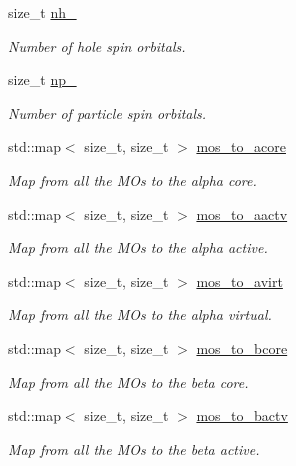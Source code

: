 \begin{DoxyCompactItemize}
size\+\_\+t \mbox{\hyperlink{classforte_1_1_m_r_d_s_r_g___s_o_a5182491a02b57cd7fd354de659771492}{nh\+\_\+}}
\begin{DoxyCompactList}\small\item\em Number of hole spin orbitals. \end{DoxyCompactList}\item 
size\+\_\+t \mbox{\hyperlink{classforte_1_1_m_r_d_s_r_g___s_o_ad7a2af8f622cac6c962fba2ae168afd1}{np\+\_\+}}
\begin{DoxyCompactList}\small\item\em Number of particle spin orbitals. \end{DoxyCompactList}\item 
std\+::map$<$ size\+\_\+t, size\+\_\+t $>$ \mbox{\hyperlink{classforte_1_1_m_r_d_s_r_g___s_o_a143280bec9a80e7d7f05b2301aa16c1c}{mos\+\_\+to\+\_\+acore}}
\begin{DoxyCompactList}\small\item\em Map from all the M\+Os to the alpha core. \end{DoxyCompactList}\item 
std\+::map$<$ size\+\_\+t, size\+\_\+t $>$ \mbox{\hyperlink{classforte_1_1_m_r_d_s_r_g___s_o_a541c68c49435f94b05f67bcb4e328ee5}{mos\+\_\+to\+\_\+aactv}}
\begin{DoxyCompactList}\small\item\em Map from all the M\+Os to the alpha active. \end{DoxyCompactList}\item 
std\+::map$<$ size\+\_\+t, size\+\_\+t $>$ \mbox{\hyperlink{classforte_1_1_m_r_d_s_r_g___s_o_af2c1f8741c08e52b01713ac32e5d2a3e}{mos\+\_\+to\+\_\+avirt}}
\begin{DoxyCompactList}\small\item\em Map from all the M\+Os to the alpha virtual. \end{DoxyCompactList}\item 
std\+::map$<$ size\+\_\+t, size\+\_\+t $>$ \mbox{\hyperlink{classforte_1_1_m_r_d_s_r_g___s_o_ae35ebe4ad8726aea4e2fc814c27433cf}{mos\+\_\+to\+\_\+bcore}}
\begin{DoxyCompactList}\small\item\em Map from all the M\+Os to the beta core. \end{DoxyCompactList}\item 
std\+::map$<$ size\+\_\+t, size\+\_\+t $>$ \mbox{\hyperlink{classforte_1_1_m_r_d_s_r_g___s_o_ae379be523c0016115a6aa4c219fc18a1}{mos\+\_\+to\+\_\+bactv}}
\begin{DoxyCompactList}\small\item\em Map from all the M\+Os to the beta active. \end{DoxyCompactList}\item 

\end{DoxyCompactItemize}
